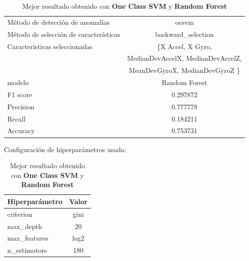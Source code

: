 \begin{appendices}
		\begin{table}[htb]
			\centering
			\caption{Mejor resultado obtenido con \textbf{One Class SVM} y \textbf{Random Forest}}
			\label{table:36}
			\begin{tabular}{lc}
				\toprule
				\midrule
					  Método de detección de anomalías &                                              ocsvm \\
				Método de selección de características &                                 backward\_selection \\
						 Características seleccionadas & \{X Accel, X Gyro, \\
						                               &   MedianDevAccelX, MedianDevAccelZ, \\
						                               &  MeanDevGyroX, MedianDevGyroZ \}\\
												modelo &                                      Random Forest \\
											  F1 score &                                           0.297872 \\
											 Precision &                                           0.777778 \\
												Recall &                                           0.184211 \\
											  Accuracy &                                           0.753731 \\
				\bottomrule
			\end{tabular}
			\newline
			\newline
			Configuración de hiperparámetros usada:
			\begin{tabular}{lc}
				\toprule
				Hiperparámetro & Valor \\
				\midrule
					 criterion &  gini \\
					 max\_depth &    20 \\
				  max\_features &  log2 \\
				  n\_estimators &   180 \\
				\bottomrule
			\end{tabular}
			
		\end{table}

\end{appendices}
